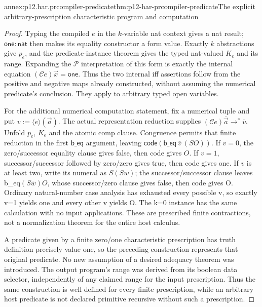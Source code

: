 \begin{annexitem}{annex:p12.har.prcompiler-predicate}{thm:p12-har-prcompiler-predicate}{The explicit arbitrary-prescription characteristic program and computation}
\begin{proof}
Typing the compiled \(e\) in the \(k\)-variable nat context gives a nat
result; \(\mathsf{one}:\mathsf{nat}\) then makes its equality constructor a form value.
Exactly \(k\) abstractions give \(p_e\), and the predicate-instance theorem
gives the typed nat-valued \(K_e\) and its range. Expanding the
\(\mathcal P\) interpretation of this form is exactly the internal
equation \((\mathcal C e)\vec x=\mathsf{one}\). Thus the two
internal iff assertions follow from the positive and negative maps
already constructed, without assuming the numerical predicate's
conclusion. They apply to arbitrary typed open variables.

For the additional numerical computation statement, fix a numerical
tuple and put \(v:=\langle e\rangle(\vec a)\). The actual
representation reduction supplies
\((\mathcal C e)\overline{\vec a}\longrightarrow^*\overline v\).
Unfold \(p_e\), \(K_e\) and the atomic comp clause. Congruence permits that
finite reduction in the first \(\mathsf{b\_eq}\) argument, leaving
\(\mathsf{code}(\mathsf{b\_eq}\ \overline v\ (S O))\).
If \(v=0\), the zero/successor equality clause gives false, then code
gives \(O\). If \(v=1\), successor/successor followed by zero/zero gives
true, then code gives one. If \(v\) is at least two, write its numeral
as \(S(S\overline w)\); the successor/successor clause leaves
b\_eq\((S\overline w)O\), whose successor/zero clause gives
false, then code gives O. Ordinary natural-number case analysis
has exhausted every possible v, so exactly v=1 yields one and
every other v yields O. The k=0 instance has the same calculation
with no input applications. These are prescribed finite contractions,
not a normalization theorem for the entire host calculus.

A predicate given by a finite zero/one characteristic prescription
has truth definition precisely value one, so the preceding construction
represents that original predicate. No new assumption of a desired
adequacy theorem was introduced. The output program's range was
derived from its boolean data selector, independently of any claimed
range for the input prescription. Thus the same construction is
well defined for every finite prescription, while an arbitrary host
predicate is not declared primitive recursive without such a prescription.
\end{proof}
\end{annexitem}

